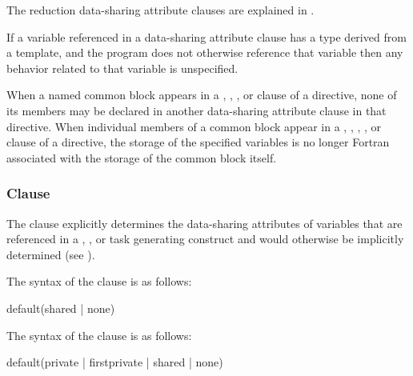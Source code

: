 The reduction data-sharing attribute clauses are explained in 
.

\begin{cppspecific}
If a variable referenced in a data-sharing attribute clause has a type derived from a
template, and the program does not otherwise reference that variable then any
behavior related to that variable is unspecified.
\end{cppspecific}

\begin{fortranspecific}
When a named common block appears in a , ,
, or  clause of a directive, none of its members 
may be declared in another data-sharing attribute clause in that directive. When 
individual members of a common block appear in a , ,
, , or  clause of a directive, the 
storage of the specified variables is no longer Fortran associated with the storage 
of the common block itself. 
\end{fortranspecific}



\subsubsection{ Clause}
\label{subsubsec:default clause}
\summary
The  clause explicitly determines the data-sharing attributes 
of variables that are referenced in a , , or task 
generating construct and would otherwise be implicitly determined (see
).

\syntax
\begin{ccppspecific}
The syntax of the  clause is as follows:

\begin{ompSyntax}
default(shared \textnormal{|} none)
\end{ompSyntax}
\end{ccppspecific}

\begin{fortranspecific}
The syntax of the  clause is as follows:

\begin{ompSyntax}
default(private \textnormal{|} firstprivate \textnormal{|} shared \textnormal{|} none)
\end{ompSyntax}
\end{fortranspecific}

